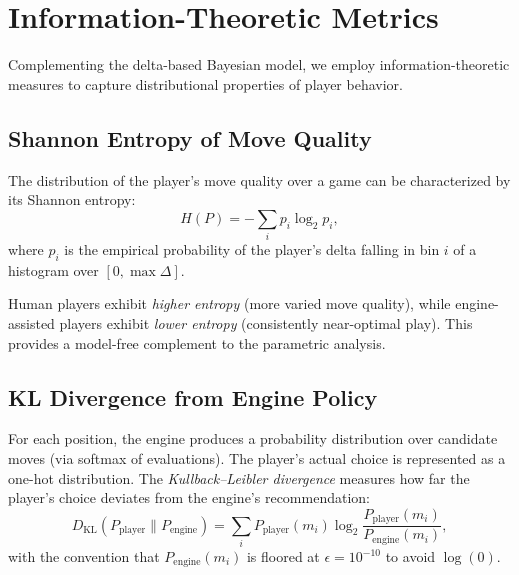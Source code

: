 \documentclass[11pt,a4paper]{article}
\begin{document}
\section{Information-Theoretic Metrics}
\label{sec:information_theory}

Complementing the delta-based Bayesian model, we employ information-theoretic
measures to capture distributional properties of player behavior.

\subsection{Shannon Entropy of Move Quality}

The distribution of the player's move quality over a game can be characterized
by its Shannon entropy:
\begin{equation}
    H(P) = -\sum_{i} p_i \log_2 p_i,
    \label{eq:shannon}
\end{equation}
where $p_i$ is the empirical probability of the player's delta falling in bin
$i$ of a histogram over $[0, \max \Delta]$.

Human players exhibit \emph{higher entropy} (more varied move quality), while
engine-assisted players exhibit \emph{lower entropy} (consistently near-optimal
play). This provides a model-free complement to the parametric analysis.

\subsection{KL Divergence from Engine Policy}

For each position, the engine produces a probability distribution over
candidate moves (via softmax of evaluations). The player's actual choice is
represented as a one-hot distribution. The \emph{Kullback--Leibler divergence}
measures how far the player's choice deviates from the engine's recommendation:
\begin{equation}
    D_{\text{KL}}(P_{\text{player}} \| P_{\text{engine}}) = \sum_{i}
    P_{\text{player}}(m_i) \log_2 \frac{P_{\text{player}}(m_i)}
    {P_{\text{engine}}(m_i)},
    \label{eq:kl_divergence}
\end{equation}
with the convention that $P_{\text{engine}}(m_i)$ is floored at $\epsilon =
10^{-10}$ to avoid $\log(0)$.
\end{document}
